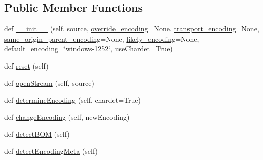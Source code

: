 \subsection*{Public Member Functions}
\begin{DoxyCompactItemize}
\item 
def \hyperlink{classpip_1_1__vendor_1_1html5lib_1_1__inputstream_1_1HTMLBinaryInputStream_a0ffa5c0b7956975f3ee09dab1b8a53bd}{\+\_\+\+\_\+init\+\_\+\+\_\+} (self, source, \hyperlink{classpip_1_1__vendor_1_1html5lib_1_1__inputstream_1_1HTMLBinaryInputStream_a60ee6331ccd6570a00190afe2f8501e9}{override\+\_\+encoding}=None, \hyperlink{classpip_1_1__vendor_1_1html5lib_1_1__inputstream_1_1HTMLBinaryInputStream_a52bfb43a6ec6db715b0875cbad0900e8}{transport\+\_\+encoding}=None, \hyperlink{classpip_1_1__vendor_1_1html5lib_1_1__inputstream_1_1HTMLBinaryInputStream_a1d13eb92e337232831198e804406ddb4}{same\+\_\+origin\+\_\+parent\+\_\+encoding}=None, \hyperlink{classpip_1_1__vendor_1_1html5lib_1_1__inputstream_1_1HTMLBinaryInputStream_a9b1dfdeda3522560f32c80bfbe7fc0e4}{likely\+\_\+encoding}=None, \hyperlink{classpip_1_1__vendor_1_1html5lib_1_1__inputstream_1_1HTMLBinaryInputStream_aeeefce990096c892218391afaf488d82}{default\+\_\+encoding}=\char`\"{}windows-\/1252\char`\"{}, use\+Chardet=True)
\item 
def \hyperlink{classpip_1_1__vendor_1_1html5lib_1_1__inputstream_1_1HTMLBinaryInputStream_a208819de9d665e6a3495accf823e7523}{reset} (self)
\item 
def \hyperlink{classpip_1_1__vendor_1_1html5lib_1_1__inputstream_1_1HTMLBinaryInputStream_a130683adf40d7ed6dd517b9ce34f5019}{open\+Stream} (self, source)
\item 
def \hyperlink{classpip_1_1__vendor_1_1html5lib_1_1__inputstream_1_1HTMLBinaryInputStream_a50f4ba39aaf985a0016c6bc4b0043f5f}{determine\+Encoding} (self, chardet=True)
\item 
def \hyperlink{classpip_1_1__vendor_1_1html5lib_1_1__inputstream_1_1HTMLBinaryInputStream_a137e8842958cefcbcc82a32fac1103af}{change\+Encoding} (self, new\+Encoding)
\item 
def \hyperlink{classpip_1_1__vendor_1_1html5lib_1_1__inputstream_1_1HTMLBinaryInputStream_a7c1a5c5e46131f40683e97bc5b59ceb6}{detect\+B\+OM} (self)
\item 
def \hyperlink{classpip_1_1__vendor_1_1html5lib_1_1__inputstream_1_1HTMLBinaryInputStream_a5e7df8e04917a641abe92fcb3564fb89}{detect\+Encoding\+Meta} (self)
\end{DoxyCompactItemize}
